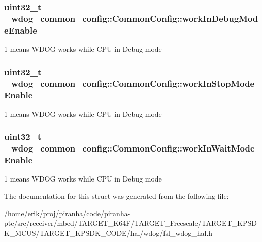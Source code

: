 \subsubsection[{\texorpdfstring{work\+In\+Debug\+Mode\+Enable}{workInDebugModeEnable}}]{\setlength{\rightskip}{0pt plus 5cm}uint32\+\_\+t \+\_\+wdog\+\_\+common\+\_\+config\+::\+Common\+Config\+::work\+In\+Debug\+Mode\+Enable}\hypertarget{struct__wdog__common__config_1_1CommonConfig_a835368843758b9da5db644544c55ed7f}{}\label{struct__wdog__common__config_1_1CommonConfig_a835368843758b9da5db644544c55ed7f}
1 means W\+D\+OG works while C\+PU in Debug mode 
\subsubsection[{\texorpdfstring{work\+In\+Stop\+Mode\+Enable}{workInStopModeEnable}}]{\setlength{\rightskip}{0pt plus 5cm}uint32\+\_\+t \+\_\+wdog\+\_\+common\+\_\+config\+::\+Common\+Config\+::work\+In\+Stop\+Mode\+Enable}\hypertarget{struct__wdog__common__config_1_1CommonConfig_ac271318a12767990e7cadad2ecb5b06c}{}\label{struct__wdog__common__config_1_1CommonConfig_ac271318a12767990e7cadad2ecb5b06c}
1 means W\+D\+OG works while C\+PU in Debug mode 
\subsubsection[{\texorpdfstring{work\+In\+Wait\+Mode\+Enable}{workInWaitModeEnable}}]{\setlength{\rightskip}{0pt plus 5cm}uint32\+\_\+t \+\_\+wdog\+\_\+common\+\_\+config\+::\+Common\+Config\+::work\+In\+Wait\+Mode\+Enable}\hypertarget{struct__wdog__common__config_1_1CommonConfig_a10333d3fe03c8a8394318a1a3cf5c89e}{}\label{struct__wdog__common__config_1_1CommonConfig_a10333d3fe03c8a8394318a1a3cf5c89e}
1 means W\+D\+OG works while C\+PU in Debug mode 

The documentation for this struct was generated from the following file\+:\begin{DoxyCompactItemize}
\item 
/home/erik/proj/piranha/code/piranha-\/ptc/src/receiver/mbed/\+T\+A\+R\+G\+E\+T\+\_\+\+K64\+F/\+T\+A\+R\+G\+E\+T\+\_\+\+Freescale/\+T\+A\+R\+G\+E\+T\+\_\+\+K\+P\+S\+D\+K\+\_\+\+M\+C\+U\+S/\+T\+A\+R\+G\+E\+T\+\_\+\+K\+P\+S\+D\+K\+\_\+\+C\+O\+D\+E/hal/wdog/fsl\+\_\+wdog\+\_\+hal.\+h\end{DoxyCompactItemize}
